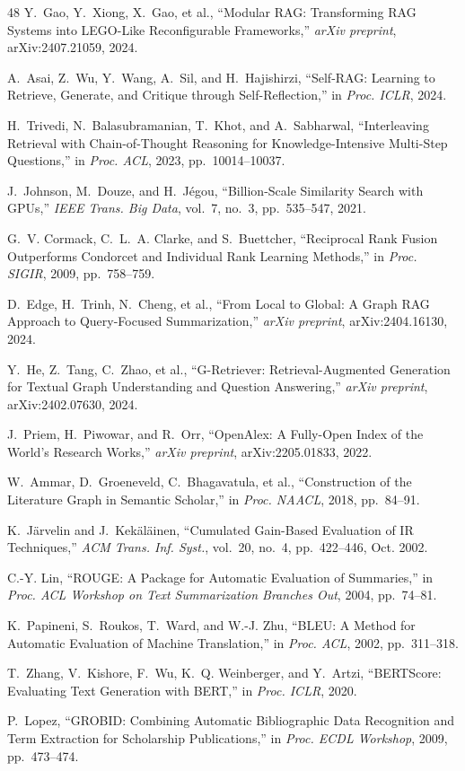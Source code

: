 \documentclass[conference,10pt,twocolumn]{IEEEtran}
\begin{document}
\begin{thebibliography}{48}
Y.~Gao, Y.~Xiong, X.~Gao, et al., ``Modular RAG: Transforming RAG Systems into LEGO-Like Reconfigurable Frameworks,'' \textit{arXiv preprint}, arXiv:2407.21059, 2024.

A.~Asai, Z.~Wu, Y.~Wang, A.~Sil, and H.~Hajishirzi, ``Self-RAG: Learning to Retrieve, Generate, and Critique through Self-Reflection,'' in \textit{Proc. ICLR}, 2024.

H.~Trivedi, N.~Balasubramanian, T.~Khot, and A.~Sabharwal, ``Interleaving Retrieval with Chain-of-Thought Reasoning for Knowledge-Intensive Multi-Step Questions,'' in \textit{Proc. ACL}, 2023, pp.~10014--10037.

J.~Johnson, M.~Douze, and H.~J\'{e}gou, ``Billion-Scale Similarity Search with GPUs,'' \textit{IEEE Trans. Big Data}, vol.~7, no.~3, pp.~535--547, 2021.

G.~V. Cormack, C.~L.~A. Clarke, and S.~Buettcher, ``Reciprocal Rank Fusion Outperforms Condorcet and Individual Rank Learning Methods,'' in \textit{Proc. SIGIR}, 2009, pp.~758--759.

D.~Edge, H.~Trinh, N.~Cheng, et al., ``From Local to Global: A Graph RAG Approach to Query-Focused Summarization,'' \textit{arXiv preprint}, arXiv:2404.16130, 2024.

Y.~He, Z.~Tang, C.~Zhao, et al., ``G-Retriever: Retrieval-Augmented Generation for Textual Graph Understanding and Question Answering,'' \textit{arXiv preprint}, arXiv:2402.07630, 2024.

J.~Priem, H.~Piwowar, and R.~Orr, ``OpenAlex: A Fully-Open Index of the World's Research Works,'' \textit{arXiv preprint}, arXiv:2205.01833, 2022.

W.~Ammar, D.~Groeneveld, C.~Bhagavatula, et al., ``Construction of the Literature Graph in Semantic Scholar,'' in \textit{Proc. NAACL}, 2018, pp.~84--91.

K.~J\"{a}rvelin and J.~Kek\"{a}l\"{a}inen, ``Cumulated Gain-Based Evaluation of IR Techniques,'' \textit{ACM Trans. Inf. Syst.}, vol.~20, no.~4, pp.~422--446, Oct. 2002.

C.-Y. Lin, ``ROUGE: A Package for Automatic Evaluation of Summaries,'' in \textit{Proc. ACL Workshop on Text Summarization Branches Out}, 2004, pp.~74--81.

K.~Papineni, S.~Roukos, T.~Ward, and W.-J. Zhu, ``BLEU: A Method for Automatic Evaluation of Machine Translation,'' in \textit{Proc. ACL}, 2002, pp.~311--318.

T.~Zhang, V.~Kishore, F.~Wu, K.~Q. Weinberger, and Y.~Artzi, ``BERTScore: Evaluating Text Generation with BERT,'' in \textit{Proc. ICLR}, 2020.

P.~Lopez, ``GROBID: Combining Automatic Bibliographic Data Recognition and Term Extraction for Scholarship Publications,'' in \textit{Proc. ECDL Workshop}, 2009, pp.~473--474.

\end{thebibliography}
\end{document}
